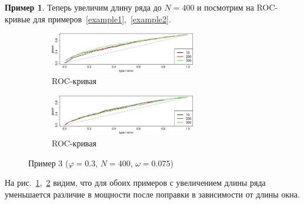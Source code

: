 \documentclass[specialist,
substylefile = spbu_report.rtx,
subf,href,colorlinks=true, 12pt]{disser}
\theoremstyle{definition}
\newtheorem{example}{Пример}
\begin{document}
\begin{example}\label{example3}
	Теперь увеличим длину ряда до $N=400$ и посмотрим на ROC-кривые для примеров~\ref{example1},~\ref{example2}.
	\begin{figure}[h!]
		\captionsetup[subfigure]{justification=Centering}
		\begin{subfigure}[t]{\textwidth}
			\centering
			\includegraphics[width=0.7\textwidth]{../cps2024/images/roc_phi7_N400.eps}
			\caption{ROC-кривая}
			\label{roc_phi7_N400}
		\end{subfigure}
		\begin{subfigure}[t]{\textwidth}
			\centering
			\includegraphics[width=0.7\textwidth]{../cps2024/images/roc_phi3_N400.eps}
			\caption{ROC-кривая}
			\label{roc_phi3_N400}
		\end{subfigure}
	\label{fig:example3}
	\caption{Пример 3 ($\varphi=0.3$, $N=400$, $\omega=0.075$)}
	\end{figure}
	На рис.~\ref{roc_phi7_N400},~\ref{roc_phi3_N400} видим, что для обоих примеров с увеличением длины ряда уменьшается различие в мощности после поправки в зависимости от длины окна.
\end{example}
\end{document}
